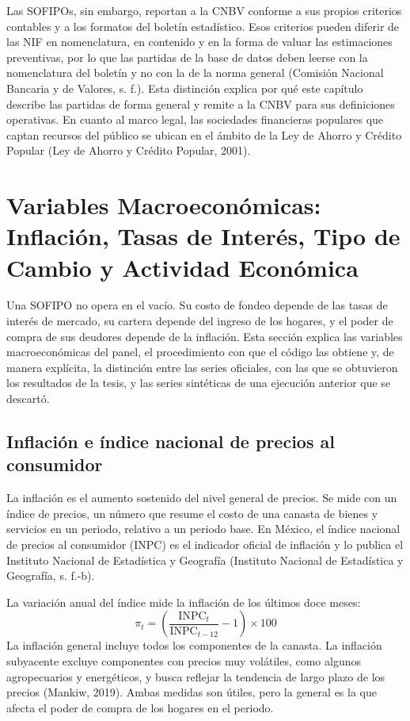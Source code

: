 Las SOFIPOs, sin embargo, reportan a la CNBV conforme a sus propios criterios contables y a los formatos del boletín estadístico. Esos criterios pueden diferir de las NIF en nomenclatura, en contenido y en la forma de valuar las estimaciones preventivas, por lo que las partidas de la base de datos deben leerse con la nomenclatura del boletín y no con la de la norma general (Comisión Nacional Bancaria y de Valores, s. f.). Esta distinción explica por qué este capítulo describe las partidas de forma general y remite a la CNBV para sus definiciones operativas. En cuanto al marco legal, las sociedades financieras populares que captan recursos del público se ubican en el ámbito de la Ley de Ahorro y Crédito Popular (Ley de Ahorro y Crédito Popular, 2001). %

\section{Variables Macroeconómicas: Inflación, Tasas de Interés, Tipo de Cambio y Actividad Económica}\label{sec:macro}

Una SOFIPO no opera en el vacío. Su costo de fondeo depende de las tasas de interés de mercado, su cartera depende del ingreso de los hogares, y el poder de compra de sus deudores depende de la inflación. Esta sección explica las variables macroeconómicas del panel, el procedimiento con que el código las obtiene y, de manera explícita, la distinción entre las series oficiales, con las que se obtuvieron los resultados de la tesis, y las series sintéticas de una ejecución anterior que se descartó.

\subsection{Inflación e índice nacional de precios al consumidor}
La inflación es el aumento sostenido del nivel general de precios. Se mide con un índice de precios, un número que resume el costo de una canasta de bienes y servicios en un periodo, relativo a un periodo base. En México, el índice nacional de precios al consumidor (INPC) es el indicador oficial de inflación y lo publica el Instituto Nacional de Estadística y Geografía (Instituto Nacional de Estadística y Geografía, s. f.-b).

La variación anual del índice mide la inflación de los últimos doce meses:
\begin{equation}
\pi_t=\left(\frac{\text{INPC}_t}{\text{INPC}_{t-12}}-1\right)\times 100
\label{eq:inflacion_anual}
\end{equation}
La inflación general incluye todos los componentes de la canasta. La inflación subyacente excluye componentes con precios muy volátiles, como algunos agropecuarios y energéticos, y busca reflejar la tendencia de largo plazo de los precios (Mankiw, 2019). Ambas medidas son útiles, pero la general es la que afecta el poder de compra de los hogares en el periodo.

